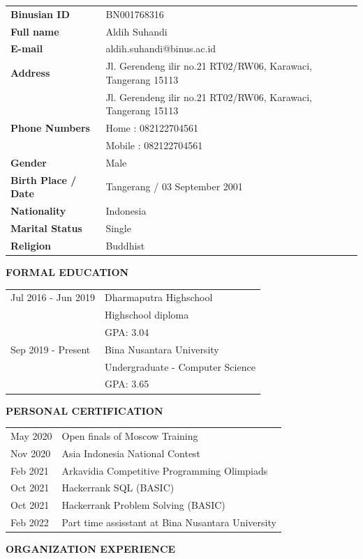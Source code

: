 \documentclass[a4paper]{article}
\begin{document}
\begin{center}
\begin{longtable}[c]{p{5cm}p{7cm}}
    \textbf{Binusian ID} & BN001768316\\
    \textbf{Full name} & Aldih Suhandi\\
    \textbf{E-mail} & aldih.suhandi@binus.ac.id\\
    \textbf{Address} & Jl. Gerendeng ilir no.21 RT02/RW06, Karawaci, Tangerang 15113\\
     & Jl. Gerendeng ilir no.21 RT02/RW06, Karawaci, Tangerang 15113\\
    \textbf{Phone Numbers} & Home   : 082122704561\\
                           & Mobile : 082122704561\\
    \textbf{Gender} & Male\\
    \textbf{Birth Place / Date} & Tangerang / 03 September 2001\\
    \textbf{Nationality} & Indonesia\\
    \textbf{Marital Status} & Single\\
    \textbf{Religion} & Buddhist\\
\end{longtable}
\end{center}
\newpage
\noindent\textbf{FORMAL EDUCATION}

\begin{center}
\begin{longtable}[c]{p{5cm}p{7cm}}
   Jul 2016 - Jun 2019 & Dharmaputra Highschool\\
                         & Highschool diploma\\
                         & GPA: 3.04\\
   Sep 2019 - Present & Bina Nusantara University\\
                              & Undergraduate - Computer Science\\
                              & GPA: 3.65\\
\end{longtable}
\end{center}
\noindent\textbf{PERSONAL CERTIFICATION}

\begin{center}
\begin{longtable}[c]{p{5cm}p{7cm}}
   May 2020 & Open finals of Moscow Training\\
   Nov 2020 & Asia Indonesia National Contest\\
   Feb 2021 & Arkavidia Competitive Programming Olimpiads\\
   Oct 2021 & Hackerrank SQL (BASIC)\\
   Oct 2021 & Hackerrank Problem Solving (BASIC)\\
   Feb 2022 & Part time assisstant at Bina Nusantara University\\
\end{longtable}
\end{center}
\textbf{ORGANIZATION EXPERIENCE}
\end{document}
